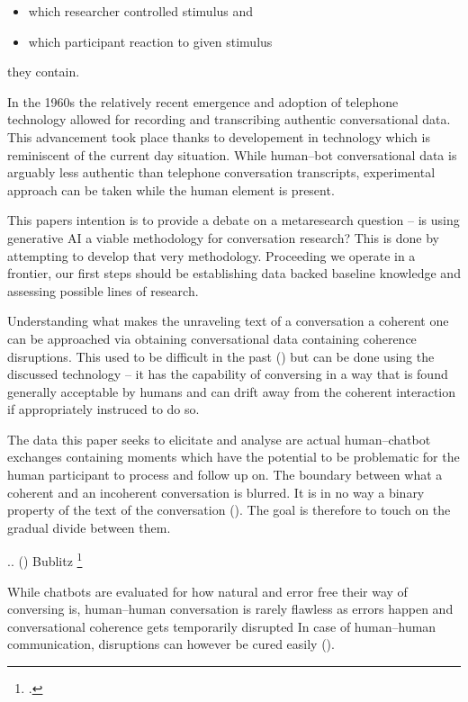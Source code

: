 \documentclass[12pt]{report}
\begin{document}
\begin{itemize}
    \item
    which researcher controlled stimulus and
    \item
    which participant reaction to given stimulus
\end{itemize}

they contain.

\par
In the 1960s the relatively recent emergence and adoption of telephone technology
allowed for recording and transcribing authentic conversational data.
This advancement took place thanks to developement in technology
which is reminiscent of the current day situation.
While human–bot conversational data is arguably less authentic than telephone conversation transcripts,
experimental approach can be taken while the human element is present.

\par
This papers intention is to provide a debate on a metaresearch question –
is using generative AI a viable methodology for conversation research?
This is done by attempting to develop that very methodology.
Proceeding we operate in a frontier,
our first steps should be establishing data backed baseline knowledge
and assessing possible lines of research.

\par
Understanding what makes
the unraveling text of a conversation a coherent one
can be approached via obtaining
conversational data containing coherence disruptions.
This used to be difficult in the past () but
can be done using the discussed technology –
it has the capability of conversing in a way
that is found generally acceptable by humans
and can drift away from the coherent interaction
if appropriately instruced to do so.

\par
The data this paper seeks to elicitate and analyse are
actual human–chatbot exchanges containing moments which
have the potential to be problematic for
the human participant to process and follow up on.
The boundary between what a coherent and an incoherent conversation is blurred.
It is in no way a binary property of the text of the conversation ().
The goal is therefore to touch on the gradual divide between them.

.. () Bublitz \footcite{bublitz1999disturbed}

\par
While chatbots are evaluated for how natural and error free their way of conversing is,
human–human conversation is rarely flawless as
errors happen and
conversational coherence gets temporarily disrupted
In case of human–human communication, disruptions can however be cured easily ().
\end{document}
